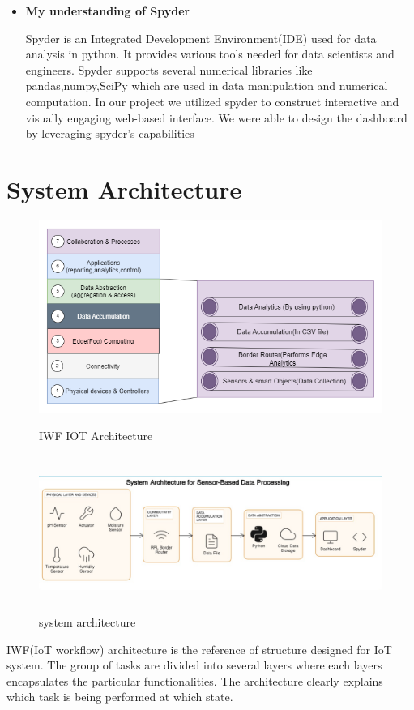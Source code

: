 \documentclass{article}
\begin{document}
\begin{itemize}
    \item \textbf{My understanding of Spyder}
    
Spyder is an Integrated Development Environment(IDE) used for data analysis in python. It provides various tools needed for data scientists and engineers. Spyder supports several numerical libraries like pandas,numpy,SciPy which are used in data manipulation and numerical computation. In our project we utilized spyder to construct interactive and visually engaging  web-based interface. We were able to design the dashboard by leveraging spyder's capabilities
\end{itemize}


\newpage
\section{System Architecture} 

\begin{figure}[h]
    \centering
    \includegraphics[width=1.0\textwidth]{IWF_IOT_Architecture.drawio (2)}
    \caption{IWF  IOT  Architecture}
    \label{fig:example}

    \centering
    \includegraphics[width=1.0\textwidth, height=2in]{system_architecture.jpg}  
    \caption{system architecture}
    \label{fig:example}
\end{figure}
IWF(IoT workflow) architecture is the reference of structure designed for IoT system. The group of tasks are divided into several layers where each layers encapsulates the particular functionalities. The architecture clearly explains which task is being performed at which state.
\newpage
\end{document}
